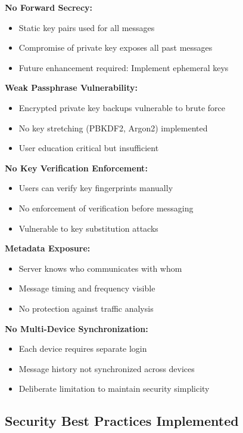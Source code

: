 \textbf{No Forward Secrecy:}
\begin{itemize}
    \item Static key pairs used for all messages
    \item Compromise of private key exposes all past messages
    \item Future enhancement required: Implement ephemeral keys
\end{itemize}

\textbf{Weak Passphrase Vulnerability:}
\begin{itemize}
    \item Encrypted private key backups vulnerable to brute force
    \item No key stretching (PBKDF2, Argon2) implemented
    \item User education critical but insufficient
\end{itemize}

\textbf{No Key Verification Enforcement:}
\begin{itemize}
    \item Users can verify key fingerprints manually
    \item No enforcement of verification before messaging
    \item Vulnerable to key substitution attacks
\end{itemize}

\textbf{Metadata Exposure:}
\begin{itemize}
    \item Server knows who communicates with whom
    \item Message timing and frequency visible
    \item No protection against traffic analysis
\end{itemize}

\textbf{No Multi-Device Synchronization:}
\begin{itemize}
    \item Each device requires separate login
    \item Message history not synchronized across devices
    \item Deliberate limitation to maintain security simplicity
\end{itemize}

\subsection{Security Best Practices Implemented}

